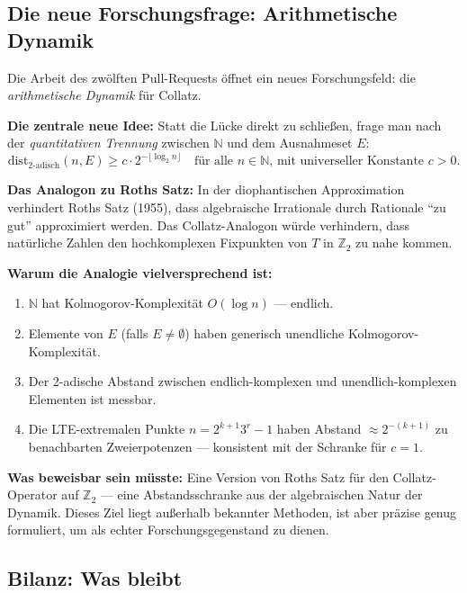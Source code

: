 \documentclass[12pt,a4paper]{article}
\newcommand{\N}{\mathbb{N}}
\newcommand{\Ztwo}{\mathbb{Z}_2}
\begin{document}
\subsection*{Die neue Forschungsfrage: Arithmetische Dynamik}

\begin{tcolorbox}[neufeld, title={Das neue Forschungsfeld (PR \#12)}]
Die Arbeit des zwölften Pull-Requests öffnet ein neues Forschungsfeld:
die \emph{arithmetische Dynamik} für Collatz.

\medskip
\textbf{Die zentrale neue Idee:}
Statt die Lücke direkt zu schließen, frage man nach der \emph{quantitativen
Trennung} zwischen $\N$ und dem Ausnahmeset $E$:
\[
  \mathrm{dist}_{2\text{-adisch}}(n, E) \geq c \cdot 2^{-\lfloor\log_2 n\rfloor}
  \quad \text{für alle } n \in \N \text{, mit universeller Konstante } c > 0.
\]

\medskip
\textbf{Das Analogon zu Roths Satz:} In der diophantischen Approximation
verhindert Roths Satz (1955), dass algebraische Irrationale durch Rationale
``zu gut'' approximiert werden. Das Collatz-Analogon würde verhindern, dass
natürliche Zahlen den hochkomplexen Fixpunkten von $T$ in $\Ztwo$ zu
nahe kommen.

\medskip
\textbf{Warum die Analogie vielversprechend ist:}
\begin{enumerate}[label=(\arabic*), nosep, itemsep=2pt]
  \item $\N$ hat Kolmogorov-Komplexität $O(\log n)$ --- endlich.
  \item Elemente von $E$ (falls $E \neq \emptyset$) haben generisch
    unendliche Kolmogorov-Komplexität.
  \item Der 2-adische Abstand zwischen endlich-komplexen und
    unendlich-komplexen Elementen ist messbar.
  \item Die LTE-extremalen Punkte $n = 2^{k+1}3^r - 1$ haben Abstand
    $\approx 2^{-(k+1)}$ zu benachbarten Zweierpotenzen --- konsistent
    mit der Schranke für $c = 1$.
\end{enumerate}

\medskip
\textbf{Was beweisbar sein müsste:}
Eine Version von Roths Satz für den Collatz-Operator auf $\Ztwo$ ---
eine Abstandsschranke aus der algebraischen Natur der Dynamik.
Dieses Ziel liegt außerhalb bekannter Methoden, ist aber präzise
genug formuliert, um als echter Forschungsgegenstand zu dienen.
\end{tcolorbox}

\subsection*{Bilanz: Was bleibt}
\end{document}
